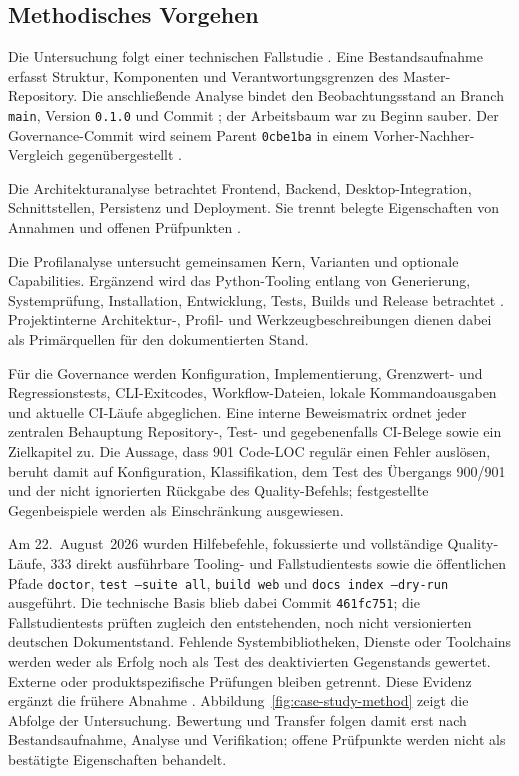 \subsection{Methodisches Vorgehen}
\label{subsec:methodisches-vorgehen}

Die Untersuchung folgt einer technischen Fallstudie
\parencite{runeson2009case-study}. Eine Bestandsaufnahme erfasst Struktur,
Komponenten und Verantwortungsgrenzen des Master-Repository. Die anschließende
Analyse bindet den Beobachtungsstand an Branch \texttt{main}, Version
\texttt{0.1.0} und Commit
; der Arbeitsbaum war zu Beginn
sauber. Der Governance-Commit wird seinem Parent \texttt{0cbe1ba} in einem
Vorher-Nachher-Vergleich gegenübergestellt
\parencite{kleiveist2026governance-snapshot,kleiveist2026governance-commit}.

Die Architekturanalyse betrachtet Frontend, Backend, Desktop-Integration,
Schnittstellen, Persistenz und Deployment. Sie trennt belegte Eigenschaften
von Annahmen und offenen Prüfpunkten \parencite{kleiveist2026architecture}.

Die Profilanalyse untersucht gemeinsamen Kern, Varianten und optionale
Capabilities. Ergänzend wird das Python-Tooling entlang von Generierung,
Systemprüfung, Installation, Entwicklung, Tests, Builds und Release betrachtet
\parencite{kleiveist2026profiles,kleiveist2026tooling}.
Projektinterne Architektur-, Profil- und Werkzeugbeschreibungen dienen dabei
als Primärquellen für den dokumentierten Stand.

Für die Governance werden Konfiguration, Implementierung, Grenzwert- und
Regressionstests, CLI-Exitcodes, Workflow-Dateien, lokale Kommandoausgaben und
aktuelle CI-Läufe abgeglichen. Eine interne Beweismatrix ordnet jeder zentralen
Behauptung Repository-, Test- und gegebenenfalls CI-Belege sowie ein Zielkapitel
zu. Die Aussage, dass 901 Code-LOC regulär einen Fehler auslösen, beruht damit
auf Konfiguration, Klassifikation, dem Test des Übergangs 900/901 und der
nicht ignorierten Rückgabe des Quality-Befehls; festgestellte Gegenbeispiele
werden als Einschränkung ausgewiesen.

Am 22.~August~2026 wurden Hilfebefehle, fokussierte und vollständige
Quality-Läufe, 333 direkt ausführbare Tooling- und Fallstudientests sowie die
öffentlichen Pfade \texttt{doctor}, \texttt{test --suite all},
\texttt{build web} und \texttt{docs index --dry-run} ausgeführt.
Die technische Basis blieb dabei Commit \texttt{461fc751}; die
Fallstudientests prüften zugleich den entstehenden, noch nicht versionierten
deutschen Dokumentstand. Fehlende
Systembibliotheken, Dienste oder Toolchains werden weder als Erfolg noch als
Test des deaktivierten Gegenstands gewertet. Externe oder produktspezifische
Prüfungen bleiben getrennt. Diese Evidenz ergänzt die frühere Abnahme
\parencite{kleiveist2026acceptance}. Abbildung~\ref{fig:case-study-method}
zeigt die Abfolge der Untersuchung.
Bewertung und Transfer folgen damit erst nach Bestandsaufnahme, Analyse und
Verifikation; offene Prüfpunkte werden nicht als bestätigte Eigenschaften
behandelt.


